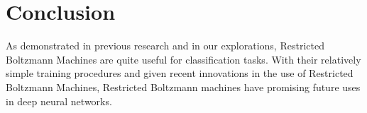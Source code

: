 \documentclass[journal]{IEEEtran}
\begin{document}
\section{Conclusion}
As demonstrated in previous research and in our explorations, Restricted Boltzmann Machines are quite useful for classification tasks. With their relatively simple training procedures and given recent innovations in the use of Restricted Boltzmann Machines, Restricted Boltzmann machines have promising future uses in deep neural networks.





%
%
%



\end{document}

